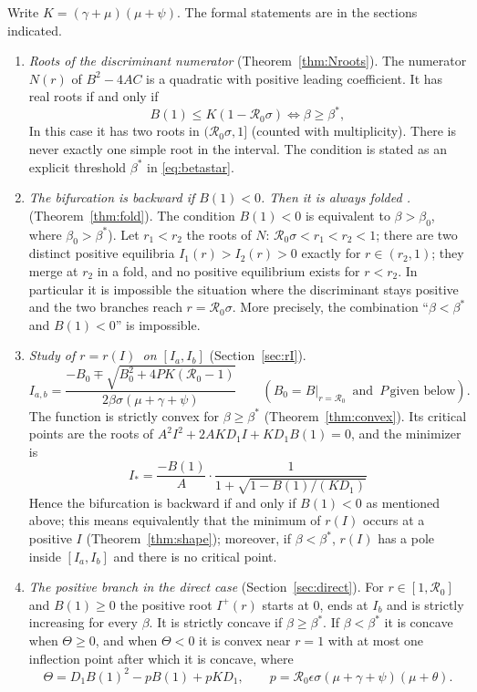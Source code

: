 \documentclass[11pt]{article}
\theoremstyle{remark}
\newcommand{\R}{\mathcal R_0}
\begin{document}
Write $K=(\gamma+\mu)(\mu+\psi)$. The formal statements are in the sections indicated.

\begin{enumerate}
\item[\textbf{R1}] \emph{Roots of the discriminant numerator} (Theorem~\ref{thm:Nroots}). The numerator $N(r)$ of $B^2-4AC$ is a quadratic with positive leading coefficient. 
It  has real roots if and only if
\[
B(1)\le K(1-\R\sigma)\iff\beta\ge\beta^*,
\]
In this case it  has two roots in $(\R\sigma,1]$ (counted with multiplicity). There is never exactly one simple root in the interval. The condition is stated as an explicit threshold $\beta^*$ in \eqref{eq:betastar}.

\item[\textbf{R2}] \emph{The bifurcation is backward if $B(1)<0$.  Then it is   always folded .}  (Theorem~\ref{thm:fold}).  The condition $B(1)<0$  is equivalent to  $\beta>\beta_0$, where $\beta_0>\beta^*$).   Let  $r_1<r_2$ the roots of $N$: $\R\sigma<r_1<r_2<1$; there are two distinct positive equilibria $I_1(r)>I_2(r)>0$ exactly for $r\in(r_2,1)$; they merge at $r_2$ in a fold, and no positive equilibrium exists for $r<r_2$. In particular it is impossible  the situation where the discriminant stays positive and the two branches reach $r=\R\sigma$.  More precisely,  the  combination ``$\beta<\beta^*$ and $B(1)<0$'' is impossible.

\item[\textbf{R3}] \emph{Study of $r=r(I)\, $  on $[I_a,I_b]$} (Section~\ref{sec:rI}). %
\[
I_{a,b}=\frac{-B_0\mp\sqrt{B_0^2+4PK(\R-1)}}{2\beta\sigma(\mu+\gamma+\psi)}\qquad(B_0=B|_{r=\R} \,\,\,  \text{and }  \, P \, \text{given below}). 
\]
The function is strictly convex for $\beta\ge\beta^*$ (Theorem~\ref{thm:convex}). Its critical points are the roots of $A^2I^2+2AKD_1I+KD_1B(1)=0$, and the minimizer is
\[
I_*=\frac{-B(1)}{A}\cdot\frac{1}{1+\sqrt{1-B(1)/(KD_1)}  }%
\]
Hence the bifurcation is backward if and only if $B(1)<0$ as mentioned above; this means equivalently  that   the minimum of $r(I)$ occurs at a positive $I$ (Theorem~\ref{thm:shape}); moreover,  if  $\beta<\beta^*$, $r(I)$ has a pole inside $[I_a,I_b]$ and there is no critical point.

\item[\textbf{R4}] \emph{The positive branch in the direct case} (Section~\ref{sec:direct}). For $r\in[1,\R]$ and $B(1)\ge0$ the positive root $I^+(r)$ starts at $0$, ends at $I_b$ and is strictly increasing for every $\beta$. It is strictly concave if $\beta\ge\beta^*$. If $\beta<\beta^*$ it is concave when $\Theta\ge0$, and when $\Theta<0$ it is convex near $r=1$ with at most one inflection point after which it is concave, where
\[
\Theta=D_1B(1)^2-pB(1)+pKD_1,\qquad p=\R\epsilon\sigma(\mu+\gamma+\psi)(\mu+\theta).
\]
\end{enumerate}
\end{document}
